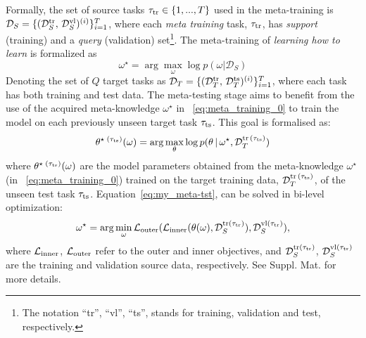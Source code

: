Formally, the set of source tasks $\tau_{\rm tr} \in \{1, ...,T\}$ used in the meta-training is ${\cal D}_{S} = \{ ({\cal D}^{\rm tr}_{S}, \, {\cal D}^{\rm vl}_{S} )^{(i)} \}_{i=1}^{T}$, where each {\it meta training} task, $\tau_{\rm tr}$, has \emph{support} (training) and a \emph{query} (validation) set\footnote{The notation ``tr'', ``vl'', ``ts'', stands for training, validation and test, respectively.}. The meta-training of {\it learning how to learn} is formalized as 
\begin{equation}
    \omega^{\star} =  \arg\max_{\omega}  \log p(\omega| \mathcal{D}_S)
    \label{eq:meta_training_0}
\end{equation}
Denoting the set of $Q$ target tasks as ${\cal D}_{T} = \{ ({\cal D}^{\rm tr}_{T}, \, {\cal D}^{\rm ts}_{T} )^{(i)} \}_{i=1}^{T}$, where each task has both training and test data. The meta-testing stage aims to benefit from the use of the acquired meta-knowledge $\omega^{\star}$ in ~\cref{eq:meta_training_0} to train the model on each previously unseen target task $\tau_{\rm ts}$. This goal is formalised as:
\begin{equation}
    \theta^{{\star}\;(\tau_{\rm ts})}(\omega) = \arg\max_{\theta} \log p (\theta\,|\, \omega^{\star}, {\cal D}_{T}^{{\rm tr}\,(\tau_{\rm ts})}) \label{eq:my_meta-tst}
\end{equation}
where $\theta^{{\star}\;(\tau_{\rm ts})}(\omega)$ are the model parameters obtained from the  meta-knowledge $\omega^{\star}$ (in ~\cref{eq:meta_training_0}) trained on the target training data, ${\cal D}_{T}^{{\rm tr}\,(\tau_{\rm ts})}$, of the unseen test task $\tau_{\rm ts}$.
Equation~\cref{eq:my_meta-tst}, can be solved in bi-level optimization:
\begin{equation}
    \omega^{{\star}} = \arg\min_{\omega} {\cal L}_{\rm outer} ({\cal L}_{\rm inner} (\theta(\omega), \mathcal{D}^{{\rm tr}(\tau_{\rm tr})}_{S}),\mathcal{D}^{{\rm vl}(\tau_{\rm tr})}_{S}),\label{eq:meta}
\end{equation}
where ${\cal L}_{\rm inner}$, ${\cal L}_{\rm outer}$ refer to the outer and inner objectives, and  $\mathcal{D}^{{\rm tr}(\tau_{\rm tr})}_{S}$, $\mathcal{D}^{{\rm vl}(\tau_{\rm tr})}_{S}$ are the training and validation source data, respectively.
See  Suppl. Mat. for more details.


